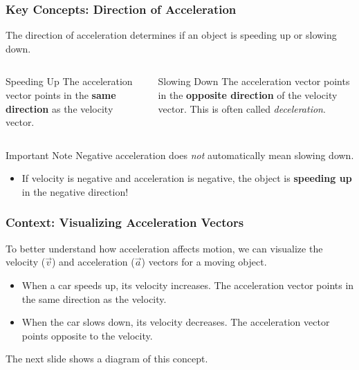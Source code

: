 \documentclass{beamer}
\begin{document}
\begin{frame}
\frametitle{Key Concepts: Direction of Acceleration}
The direction of acceleration determines if an object is speeding up or slowing down.
\pause
\begin{columns}[T]
    \begin{alertblock}{Speeding Up}
        The acceleration vector points in the \textbf{same direction} as the velocity vector.
    \end{alertblock}
    
    \begin{alertblock}{Slowing Down}
        The acceleration vector points in the \textbf{opposite direction} of the velocity vector. This is often called \textit{deceleration}.
    \end{alertblock}
\end{columns}
\pause
\begin{block}{Important Note}
    Negative acceleration does \textit{not} automatically mean slowing down.
    \begin{itemize}
        \item If velocity is negative and acceleration is negative, the object is \textbf{speeding up} in the negative direction!
    \end{itemize}
\end{block}
\end{frame}

\begin{frame}
\frametitle{Context: Visualizing Acceleration Vectors}
To better understand how acceleration affects motion, we can visualize the velocity ($\vec{v}$) and acceleration ($\vec{a}$) vectors for a moving object.
\pause
\begin{itemize}
    \item When a car speeds up, its velocity increases. The acceleration vector points in the same direction as the velocity.
    \pause
    \item When the car slows down, its velocity decreases. The acceleration vector points opposite to the velocity.
\end{itemize}
\pause
The next slide shows a diagram of this concept.
\end{frame}
\end{document}
